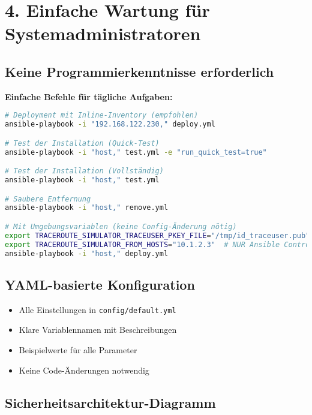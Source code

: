 \documentclass[10pt,a4paper]{article}
\begin{document}
\section*{4. Einfache Wartung für Systemadministratoren}

\subsection*{Keine Programmierkenntnisse erforderlich}

\textbf{Einfache Befehle für tägliche Aufgaben:}
\begin{lstlisting}[language=bash]
# Deployment mit Inline-Inventory (empfohlen)
ansible-playbook -i "192.168.122.230," deploy.yml

# Test der Installation (Quick-Test)
ansible-playbook -i "host," test.yml -e "run_quick_test=true"

# Test der Installation (Vollständig)
ansible-playbook -i "host," test.yml

# Saubere Entfernung
ansible-playbook -i "host," remove.yml

# Mit Umgebungsvariablen (keine Config-Änderung nötig)
export TRACEROUTE_SIMULATOR_TRACEUSER_PKEY_FILE="/tmp/id_traceuser.pub"
export TRACEROUTE_SIMULATOR_FROM_HOSTS="10.1.2.3"  # NUR Ansible Controller!
ansible-playbook -i "host," deploy.yml
\end{lstlisting}

\subsection*{YAML-basierte Konfiguration}
\begin{itemize}    \item Alle Einstellungen in \texttt{config/default.yml}
    \item Klare Variablennamen mit Beschreibungen
    \item Beispielwerte für alle Parameter
    \item Keine Code-Änderungen notwendig
\end{itemize}

\subsection*{Sicherheitsarchitektur-Diagramm}
\end{document}
